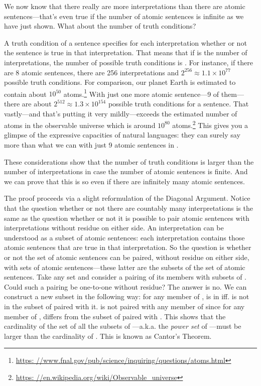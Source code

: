 We now know that there really are more interpretations than there are atomic 
sentences---that's even true if the number of atomic sentences is infinite as we 
have just shown. What about the number of truth conditions? 

A truth condition of a sentence  specifies for each interpretation whether or not the 
sentence is true in that interpretation.  That means that if  is the 
number of interpretations, the number of possible truth conditions is .  
For instance, if there are 8 atomic sentences, there are 256 interpretations  and $2^{256}
\approx 1.1\times 10^{77}$ possible truth conditions.  For comparison, our 
planet Earth is estimated to contain about $10^{50}$ atoms.\footnote{\url{https:
//www.fnal.gov/pub/science/inquiring/questions/atoms.html}}
With just one more atomic sentence---9 of them---there are about $2^{512}\approx 
1.3\times 10^{154}$ possible truth conditions for a sentence. That vastly---and 
that's putting it very mildly---exceeds the estimated number of atoms in the 
observable universe which is around $10^{80}$ atoms.\footnote{\url{https:
//en.wikipedia.org/wiki/Observable_universe}} This gives you a glimpse of the 
expressive capacities of natural languages: they can surely say more than what 
we can with just 9 atomic sentences in \lL{}. 

These considerations show that the number of truth conditions is larger than the 
number of interpretations in case the number of atomic sentences is finite.  And we can 
prove that this is so even if there are infinitely many atomic sentences.

The proof proceeds via a slight reformulation of the Diagonal Argument.  Notice 
that the question whether or not there are countably many interpretations is the 
same as the question whether or not  it is possible to pair atomic sentences 
with interpretations without residue on either side. An interpretation can be 
understood as a subset of atomic sentences: each interpretation contains those 
atomic sentences that are true in that interpretation. So the question is 
whether or not the set of atomic sentences can be paired, without residue on 
either side,  with sets of atomic sentences---these latter are the subsets of 
the set of atomic sentences.  Take any set  and consider a pairing 
of its members with subsets of . Could such a pairing be 
one-to-one without residue? The answer is no.  We can construct a  new subset 
 in the following way: for any member  of , 
 is in  iff.   is not in the subset of  
paired with it.   is not paired with any member of  
since for any member  of ,  differs from the 
subset of  paired with . This shows that the cardinality of 
the set of all the subsets of ---a.k.a. the \emph{power set} of 
---must be larger than the cardinality of .  This is 
known as Cantor's Theorem. 


